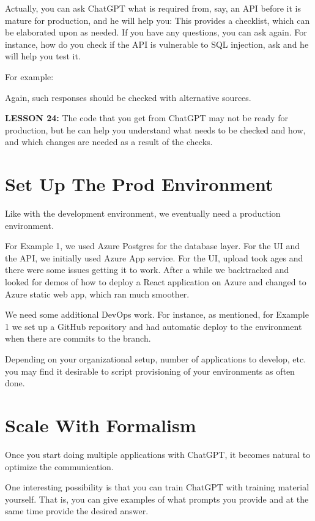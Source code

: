 \documentclass[runningheads]{llncs}
\begin{document}
Actually, you can ask ChatGPT what is required from, say, an API before it is mature for production, and he will help you:
This provides a checklist, which can be elaborated upon as needed. If you have any questions, you can ask again. For instance, how do you check if the API is vulnerable to SQL injection, ask and he will help you test it.

For example:
  
Again, such responses should be checked with alternative sources.

\textbf{LESSON 24:} The code that you get from ChatGPT may not be ready for production, but he can help you understand what needs to be checked and how, and which changes are needed as a result of the checks.

\section{Set Up The Prod Environment}

Like with the development environment, we eventually need a production environment.

For Example 1, we used Azure Postgres for the database layer. For the UI and the API, we initially used Azure App service. For the UI, upload took ages and there were some issues getting it to work. After a while we backtracked and looked for demos of how to deploy a React application on Azure and changed to Azure static web app, which ran much smoother.

We need some additional DevOps work. For instance, as mentioned, for Example 1 we set up a GitHub repository and had automatic deploy to the environment when there are commits to the branch.

Depending on your organizational setup, number of applications to develop, etc. you may find it desirable to script provisioning of your environments as often done.

\section{Scale With Formalism}

Once you start doing multiple applications with ChatGPT, it becomes natural to optimize the communication.

One interesting possibility is that you can train ChatGPT with training material yourself. That is, you can give examples of what prompts you provide and at the same time provide the desired answer.
\end{document}
